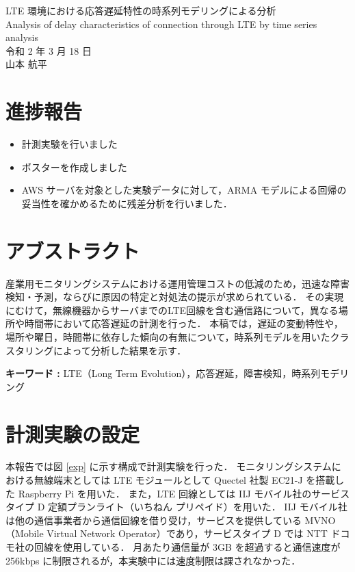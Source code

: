 \documentclass[a4j]{jarticle}
\begin{document}
\begin{table}[t]
\begin{center}
{\large LTE 環境における応答遅延特性の時系列モデリングによる分析}\\
Analysis of delay characteristics of connection through LTE by time series analysis\\
令和 2 年 3 月 18 日\\
山本 航平
\end{center}
\end{table}

\section{進捗報告}
\begin{itemize}
\item 計測実験を行いました
\item ポスターを作成しました
\item AWS サーバを対象とした実験データに対して，ARMA モデルによる回帰の妥当性を確かめるために残差分析を行いました．
\end{itemize}

\section{アブストラクト}
産業用モニタリングシステムにおける運用管理コストの低減のため，迅速な障害検知・予測，ならびに原因の特定と対処法の提示が求められている．
その実現にむけて，無線機器からサーバまでのLTE回線を含む通信路について，異なる場所や時間帯において応答遅延の計測を行った．
本稿では，遅延の変動特性や，場所や曜日，時間帯に依存した傾向の有無について，時系列モデルを用いたクラスタリングによって分析した結果を示す．

\textbf{キーワード : }LTE（Long Term Evolution），応答遅延，障害検知，時系列モデリング\\
\section{計測実験の設定}
本報告では図 \ref{exp} に示す構成で計測実験を行った．
モニタリングシステムにおける無線端末としては LTE モジュールとして Quectel 社製 EC21-J を搭載した Raspberry Pi を用いた．
また，LTE 回線としては IIJ モバイル社のサービスタイプ D 定額プランライト（いちねん プリペイド）を用いた．
IIJ モバイル社は他の通信事業者から通信回線を借り受け，サービスを提供している MVNO（Mobile Virtual Network Operator）であり，サービスタイプ D では NTT ドコモ社の回線を使用している．
月あたり通信量が 3GB を超過すると通信速度が 256kbps に制限されるが，本実験中には速度制限は課されなかった．
\end{document}
